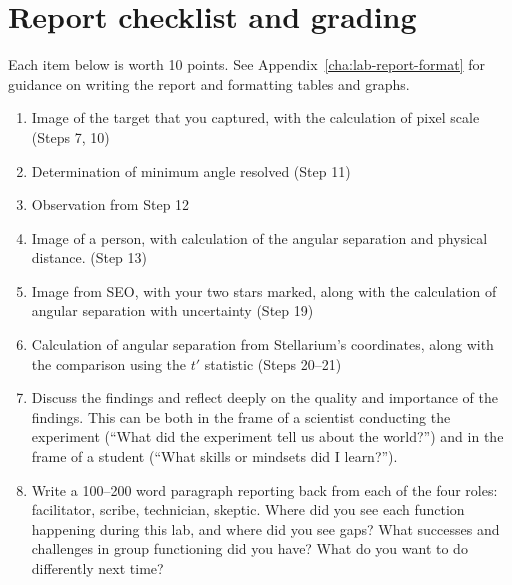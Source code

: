 \section{Report checklist and grading}

Each item below is worth 10 points. See Appendix\ \ref{cha:lab-report-format} for guidance on writing the report and formatting tables and graphs.

\begin{enumerate}
	
	\item Image of the target that you captured, with the calculation of pixel scale (Steps 7, 10)
	
	\item Determination of minimum angle resolved (Step 11)
	
	\item Observation from Step 12
	
	\item Image of a person, with calculation of the angular separation and physical distance. (Step 13)
	
	\item Image from SEO, with your two stars marked, along with the calculation of angular separation with uncertainty (Step 19)
	
	\item Calculation of angular separation from Stellarium's coordinates, along with the comparison using the $t'$ statistic (Steps 20--21)
	
	\item Discuss the findings and reflect deeply on the quality and importance of the findings. This can
	be both in the frame of a scientist conducting the experiment (“What did the experiment tell us
	about the world?”) and in the frame of a student (“What skills or mindsets did I learn?”).
	
	\item Write a 100--200 word paragraph reporting back from each of the four roles: facilitator, scribe, technician, skeptic. Where did you see each function happening during this lab, and where did you see gaps? What successes and challenges in group functioning did you have? What do you want to do differently next time?
	
\end{enumerate}